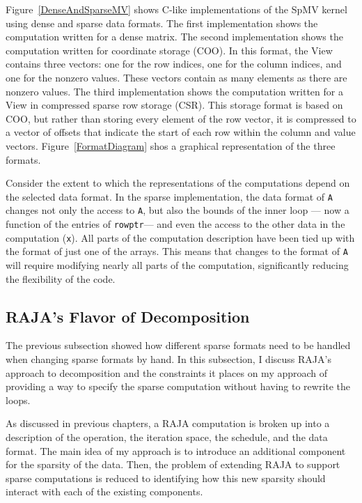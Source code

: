 Figure~\ref{DenseAndSparseMV} shows C-like implementations of the SpMV kernel using dense and sparse data formats.
The first implementation shows the computation written for a dense matrix.
The second implementation shows the computation written for coordinate storage (COO). 
In this format, the View contains three vectors: one for the row indices, one for the column indices, and one for the nonzero values.
These vectors contain as many elements as there are nonzero values.
The third implementation shows the computation written for a View in compressed sparse row storage (CSR).
This storage format is based on COO, but rather than storing every element of the row vector, it is compressed to a vector of offsets that indicate the start of each row within the column and value vectors.
Figure~\ref{FormatDiagram} shos a graphical representation of the three formats.



Consider the extent to which the representations of the computations depend on the selected data format.
In the sparse implementation, the data format of \verb.A. changes not only the access to \verb.A., but also the bounds of the inner loop --- now a function of the entries of \verb.rowptr.--- and even the access to the other data in the computation (\verb.x.).
All parts of the computation description have been tied up with the format of just one of the arrays.
This means that changes to the format of \verb.A. will require modifying nearly all parts of the computation, significantly reducing the flexibility of the code.


\subsection{RAJA's Flavor of Decomposition}
The previous subsection showed how different sparse formats need to be handled when changing sparse formats by hand.  
In this subsection, I discuss RAJA's approach to decomposition and the constraints it places on my approach of providing a way to specify the sparse computation without having to rewrite the loops.

As discussed in previous chapters, a RAJA computation is broken up into a description of the operation, the iteration space, the schedule, and the data format.
The main idea of my approach is to introduce an additional component for the sparsity of the data.
Then, the problem of extending RAJA to support sparse computations is reduced to identifying how this new sparsity should interact with each of the existing components.

